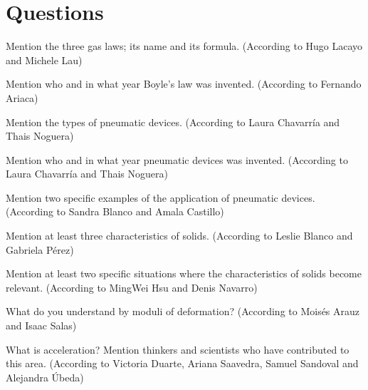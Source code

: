 \section{\large Questions}

\begin{question}
    Mention the three gas laws; its name and its formula.
    (According to Hugo Lacayo and Michele Lau)
\end{question}

\begin{question}
    Mention who and in what year Boyle's law was invented.
    (According to Fernando Ariaca)
\end{question}

\begin{question}
    Mention the types of pneumatic devices.
    (According to Laura Chavarría and Thais Noguera)
\end{question}

\begin{question}
    Mention who and in what year pneumatic devices was invented.
    (According to Laura Chavarría and Thais Noguera)
\end{question}

\begin{question}
    Mention two specific examples of the application of pneumatic devices.
    (According to Sandra Blanco and Amala Castillo)
\end{question}

\begin{question}
    Mention at least three characteristics of solids.
    (According to Leslie Blanco and Gabriela Pérez)
\end{question}

\begin{question}
    Mention at least two specific situations where the characteristics of solids become relevant.
    (According to MingWei Hsu and Denis Navarro)
\end{question}

\begin{question}
    What do you understand by moduli of deformation?
    (According to Moisés Arauz and Isaac Salas)
\end{question}

\begin{question}
    What is acceleration?
    Mention thinkers and scientists who have contributed to this area.
    (According to Victoria Duarte, Ariana Saavedra, Samuel Sandoval and Alejandra Úbeda)
\end{question}

